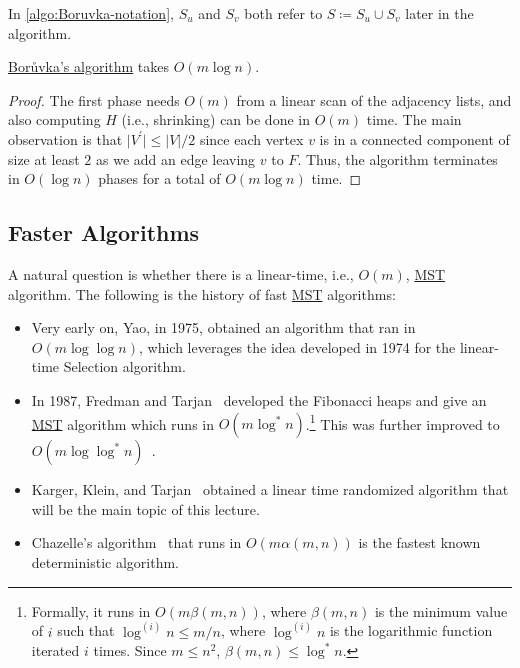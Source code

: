 \begin{notation}
	In \autoref{algo:Boruvka-notation}, \(S_u\) and \(S_v\) both refer to \(S \coloneqq S_u \cup S_v\) later in the algorithm.
\end{notation}

\begin{theorem}\label{thm:Boruvka}
	\hyperref[algo:Boruvka]{Borůvka's algorithm} takes \(O(m \log n)\).
\end{theorem}
\begin{proof}
	The first phase needs \(O(m)\) from a linear scan of the adjacency lists, and also computing \(H\) (i.e., shrinking) can be done in \(O(m)\) time. The main observation is that \(\lvert V^{\prime} \rvert \leq \lvert V \rvert / 2\) since each vertex \(v\) is in a connected component of size at least \(2\) as we add an edge leaving \(v\) to \(F\). Thus, the algorithm terminates in \(O(\log n)\) phases for a total of \(O(m \log n)\) time.
\end{proof}

\subsection{Faster Algorithms}
A natural question is whether there is a linear-time, i.e., \(O(m)\), \hyperref[prb:MST]{MST} algorithm. The following is the history of fast \hyperref[prb:MST]{MST} algorithms:
\begin{itemize}
	\item Very early on, Yao, in 1975, obtained an algorithm that ran in \(O(m \log \log n)\)\cite{yao1975log}, which leverages the idea developed in 1974 for the linear-time Selection algorithm.
	\item In 1987, Fredman and Tarjan~\cite{fredman1987fibonacci} developed the Fibonacci heaps and give an \hyperref[prb:MST]{MST} algorithm which runs in \(O(m \log ^{\ast} n)\).\footnote{Formally, it runs in \(O(m \beta (m, n))\), where \(\beta (m, n)\) is the minimum value of \(i\) such that \(\log^{(i)} n \leq m / n\), where \(\log ^{(i)} n\) is the logarithmic function iterated \(i\) times. Since \(m \leq n^2\), \(\beta (m, n) \leq \log ^{\ast} n\).} This was further improved to \(O(m \log \log ^{\ast} n)\)~\cite{gabow1986efficient}.
	\item Karger, Klein, and Tarjan~\cite{karger1995randomized} obtained a linear time randomized algorithm that will be the main topic of this lecture.
	\item Chazelle's algorithm~\cite{chazelle2000minimum} that runs in \(O(m \alpha (m, n))\) is the fastest known deterministic algorithm.
\end{itemize}


